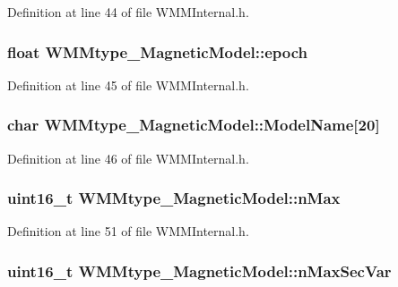 \-Definition at line 44 of file \-W\-M\-M\-Internal.\-h.

\hypertarget{struct_w_m_mtype___magnetic_model_a49af71fa7bdc1e238de0f59b941ab70c}{
\subsubsection[{epoch}]{\setlength{\rightskip}{0pt plus 5cm}float {\bf \-W\-M\-Mtype\-\_\-\-Magnetic\-Model\-::epoch}}}\label{struct_w_m_mtype___magnetic_model_a49af71fa7bdc1e238de0f59b941ab70c}


\-Definition at line 45 of file \-W\-M\-M\-Internal.\-h.

\hypertarget{struct_w_m_mtype___magnetic_model_a11d5a44016770e140c397467b40c7755}{
\subsubsection[{\-Model\-Name}]{\setlength{\rightskip}{0pt plus 5cm}char {\bf \-W\-M\-Mtype\-\_\-\-Magnetic\-Model\-::\-Model\-Name}\mbox{[}20\mbox{]}}}\label{struct_w_m_mtype___magnetic_model_a11d5a44016770e140c397467b40c7755}


\-Definition at line 46 of file \-W\-M\-M\-Internal.\-h.

\hypertarget{struct_w_m_mtype___magnetic_model_ad87a370d713ab72ff5ca801d1a3a2d4c}{
\subsubsection[{n\-Max}]{\setlength{\rightskip}{0pt plus 5cm}uint16\-\_\-t {\bf \-W\-M\-Mtype\-\_\-\-Magnetic\-Model\-::n\-Max}}}\label{struct_w_m_mtype___magnetic_model_ad87a370d713ab72ff5ca801d1a3a2d4c}


\-Definition at line 51 of file \-W\-M\-M\-Internal.\-h.

\hypertarget{struct_w_m_mtype___magnetic_model_a957006fac5ca68a6c677f6f09d0c05b4}{
\subsubsection[{n\-Max\-Sec\-Var}]{\setlength{\rightskip}{0pt plus 5cm}uint16\-\_\-t {\bf \-W\-M\-Mtype\-\_\-\-Magnetic\-Model\-::n\-Max\-Sec\-Var}}}\label{struct_w_m_mtype___magnetic_model_a957006fac5ca68a6c677f6f09d0c05b4}


